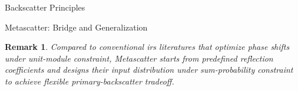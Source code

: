 \documentclass[journal]{IEEEtran}
\newtheorem{remark}{Remark}
\begin{document}
\begin{section}{Backscatter Principles}
\begin{subsection}{Metascatter: Bridge and Generalization}
		\begin{remark}
			Compared to conventional \gls{irs} literatures that optimize phase shifts under unit-module constraint, Metascatter starts from predefined reflection coefficients and designs their input distribution under sum-probability constraint to achieve flexible primary-backscatter tradeoff.
		\end{remark}
	\end{subsection}
\end{section}
\end{document}
